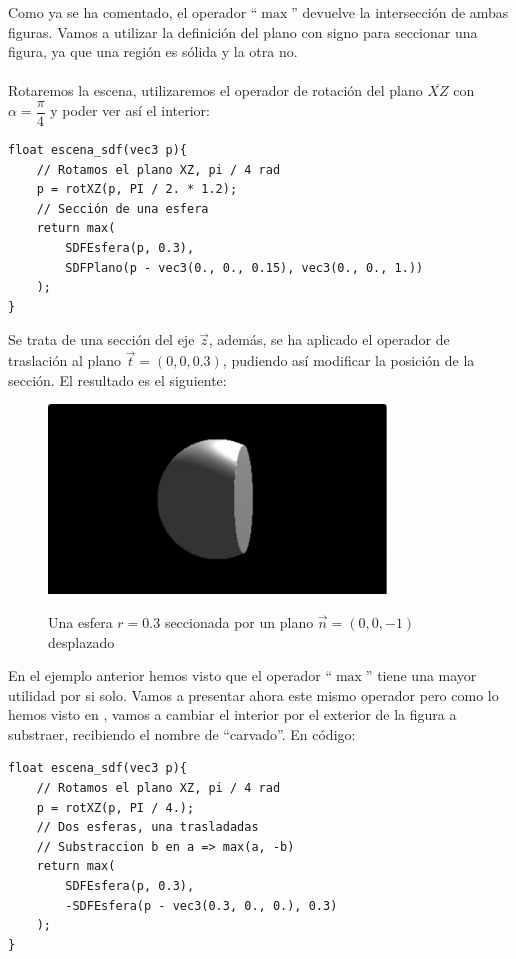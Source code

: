 Como ya se ha comentado, el operador \enquote{\(\max\)} devuelve la intersección de ambas figuras. Vamos a utilizar la definición del plano con signo para seccionar una figura, ya que una región es sólida y la otra no. \\\\
Rotaremos la escena, utilizaremos el operador de rotación del plano \(\overline{XZ}\) con \(\alpha=\dfrac{\pi}{4}\) y poder ver así el interior:

\begin{lstlisting}
float escena_sdf(vec3 p){
    // Rotamos el plano XZ, pi / 4 rad
    p = rotXZ(p, PI / 2. * 1.2);
	// Sección de una esfera
    return max(
        SDFEsfera(p, 0.3),
        SDFPlano(p - vec3(0., 0., 0.15), vec3(0., 0., 1.))
    );
}
\end{lstlisting}

Se trata de una sección del eje \(\Vec{z}\), además, se ha aplicado el operador de traslación al plano \(\Vec{t}=(0,0,0.3)\), pudiendo así modificar la posición de la sección. El resultado es el siguiente:

\begin{figure}[H]
  \centering
  \captionsetup{justification=centering}%
  \includegraphics[width=0.8\textwidth]{secciones/imagenes/sdf_seccion_3d.jpeg}\label{fig:seccion}
  \caption{Una esfera \(r=0.3\) seccionada por un plano \(\Vec{n}=(0,0,-1)\) desplazado}
\end{figure}

En el ejemplo anterior hemos visto que el operador \enquote{\(\max\)} tiene una mayor utilidad por si solo. Vamos a presentar ahora este mismo operador pero como lo hemos visto en , vamos a cambiar el interior por el exterior de la figura a substraer, recibiendo el nombre de \enquote{carvado}. En código:

\begin{lstlisting}
float escena_sdf(vec3 p){
    // Rotamos el plano XZ, pi / 4 rad
    p = rotXZ(p, PI / 4.);
    // Dos esferas, una trasladadas
    // Substraccion b en a => max(a, -b)
    return max(
        SDFEsfera(p, 0.3),
        -SDFEsfera(p - vec3(0.3, 0., 0.), 0.3)
    );
}
\end{lstlisting}

